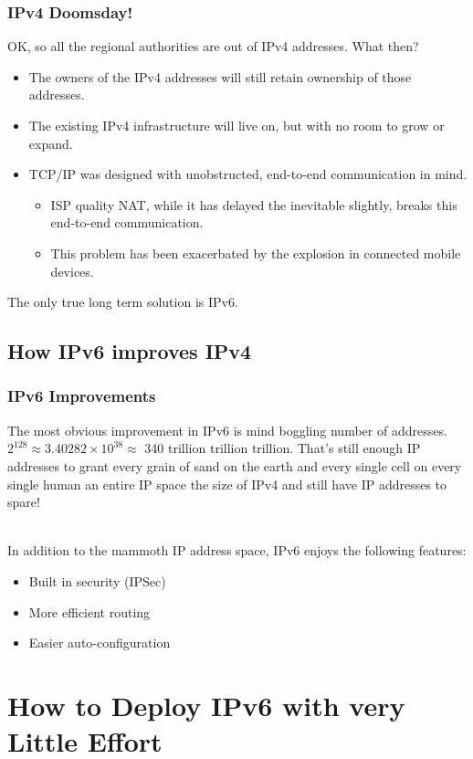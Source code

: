 \documentclass[aspectratio=169]{beamer}
\begin{document}
\begin{frame}
\frametitle{IPv4 Doomsday!}
OK, so all the regional authorities are out of IPv4 addresses. What then?
\begin{itemize}
	\pause
	\item The owners of the IPv4 addresses will still retain ownership of those addresses.
	\pause
	\item The existing IPv4 infrastructure will live on, but with no room to grow or expand.
	\pause
	\item TCP/IP was designed with unobstructed, end-to-end communication in mind.
		\begin{itemize}
			\pause
			\item ISP quality NAT, while it has delayed the inevitable slightly, breaks this end-to-end communication.
			\pause
			\item This problem has been exacerbated by the explosion in connected mobile devices.
		\end{itemize}
\end{itemize}
The only true long term solution is IPv6.
\end{frame}

\subsection{How IPv6 improves IPv4}
\begin{frame}
\frametitle{IPv6 Improvements}
The most obvious improvement in IPv6 is mind boggling number of addresses. $2^{128} \approx 3.40282 \times 10^{38} \approx$ 340 trillion trillion trillion. That's still enough IP addresses to grant every grain of sand on the earth and every single cell on every single human an entire IP space the size of IPv4 and still have IP addresses to spare!

\pause
\mbox{}\\
In addition to the mammoth IP address space, IPv6 enjoys the following features:
\begin{itemize}
	\item Built in security (IPSec)
	\pause
	\item More efficient routing
	\pause
	\item Easier auto-configuration
\end{itemize}
\end{frame}

\section{How to Deploy IPv6 with very Little Effort}
\end{document}
